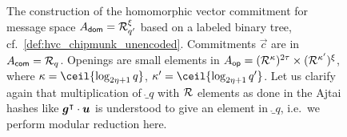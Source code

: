 \begin{figure}[pht]
\begin{pcvstack}
\begin{pchstack}[center]
{{  }}
\end{pchstack}
  \pcvspace
\begin{pchstack}
    \pchspace
    \pchspace
\end{pchstack}
\end{pcvstack}
\caption{%
The construction of the homomorphic vector commitment \eprint{$\hvcplain$}\cameraready{$\hvccamera$} for message space $A_{\mathsf{dom}} = \mathcal{R}^\xi_{q'}$ based on a labeled binary tree, cf.~\autoref{def:hvc_chipmunk_unencoded}.
Commitments $\vec{c}$ are in $A_{\mathsf{com}} = \mathcal{R}_q$.
Openings are small elements in $A_{\mathsf{op}} = (\mathcal{R}^\kappa)^{2\tau}\times (\mathcal{R}^{\kappa'})^{\xi}$, where
$\limbs = \ceil{\log_{2\eta+1}q}$, $\limbs' = \ceil{\log_{2\eta+1}q'}$.
Let us clarify again that multiplication of $\ring_q$ with $\mathcal{R}$ elements as done in the Ajtai hashes like $\boldsymbol{g}^\intercal\cdot\boldsymbol{u}$ is understood to give an element in $\ring_q$, i.e.\ we perform modular reduction here.
}
\label{fig:hvcinst}
\end{figure}


